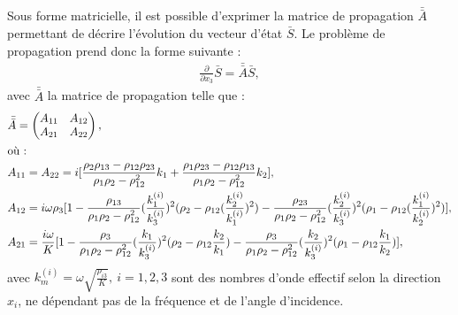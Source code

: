 \documentclass[twoside,openright]{report}
\begin{document}
    Sous forme matricielle, il est possible d'exprimer la matrice de propagation $\bar{\bar{A}}$ permettant de décrire l'évolution du vecteur d'état $\bar{S}$. Le problème de propagation prend donc la forme suivante :
    \begin{align}
    \frac{\displaystyle{\partial}}{\displaystyle{\partial x_3}}\bar{S} = \bar{\bar{A}} \bar{S},\label{Equa_diff}
    \end{align}
    avec $\bar{\bar{A}}$ la matrice de propagation telle que :
     \begin{align}
     &\bar{\bar{A}}=\begin{pmatrix}
    				A_{11} & A_{12} \\ A_{21} & A_{22}
    			\end{pmatrix}\label{Matrice_complete},\\ 
     \intertext{où :}
     &A_{11}=A_{22}=i[\frac{\rho_2\rho_{13}-\rho_{12}\rho_{23}}{\rho_1\rho_2-\rho_{12}^2}k_1+\frac{\rho_1\rho_{23}-\rho_{12}\rho_{13}}{\rho_1\rho_2-\rho_{12}^2}k_2], \\
     &A_{12}=i\omega \rho_3[1-\frac{\rho_{13}}{\rho_1\rho_2-\rho_{12}^2}(\frac{k_1^{(i)}}{k_3^{(i)}})^2(\rho_2-\rho_{12}(\frac{k_2^{(i)}}{k_1^{(i)}})^2)-\frac{\rho_{23}}{\rho_1\rho_2-\rho_{12}^2}(\frac{k_2^{(i)}}{k_3^{(i)}})^2(\rho_1-\rho_{12}(\frac{k_1^{(i)}}{k_2^{(i)}})^2)], \\
     &A_{21}=\frac{i\omega}{K}[1-\frac{\rho_3}{\rho_1\rho_2-\rho_{12}^2}(\frac{k_1}{k_3^{(i)}})^2(\rho_2-\rho_{12}\frac{k_2}{k_1})-\frac{\rho_3}{\rho_1\rho_2-\rho_{12}^2}(\frac{k_2}{k_3^{(i)}})^2(\rho_1-\rho_{12}\frac{k_1}{k_2})],
    \end{align}
    avec $k_m^{(i)}=\omega\sqrt{\frac{\rho_{i3}}{K}},\ i=1,2,3$ sont des nombres d'onde effectif selon la direction $x_i$, ne dépendant pas de la fréquence et de l'angle d'incidence.
    
\end{document}
